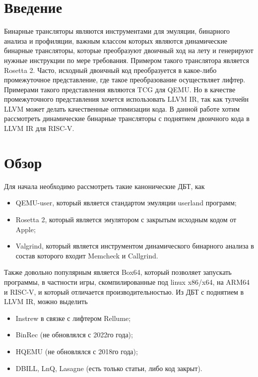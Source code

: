 
\section{Введение}
Бинарные трансляторы являются инструментами для эмуляции, бинарного анализа и профиляции, важным классом которых являются динамические бинарные трансляторы, которые преобразуют двоичный ход на лету и генерируют нужные инструкции по мере требования. Примером такого транслятора является Rosetta 2. Часто, исходный двоичный код преобразуется в какое-либо промежуточное представление, где такое преобразование осуществляет лифтер. Примерами такого представления являются TCG для QEMU. Но в качестве промежуточного представления хочется использовать LLVM IR, так как тулчейн LLVM может делать качественные оптимизации кода. В данной работе хотим рассмотреть динамические бинарные трансляторы с поднятием двоичного кода в LLVM IR для RISC-V.
\section{Обзор}
Для начала необходимо рассмотреть такие канонические ДБТ, как
\begin{itemize}
    \item QEMU-user, который является стандартом эмуляции userland программ;
    \item Rosetta 2, который является эмулятором с закрытым исходным кодом от Apple;
    \item Valgrind, который является инструментом динамического бинарного анализа в состав которого входит Memcheck и Callgrind.
\end{itemize}

Также довольно популярным является Box64, который позволяет запускать программы, в частности игры, скомпилированные под linux x86/x64, на ARM64 и RISC-V, и который отличается производительностью.
Из ДБТ с поднятием в LLVM IR, можно выделить
\begin{itemize}
    \item Instrew в связке с лифтером Rellume;
    \item BinRec (не обновлялся с 2022го года);
    \item HQEMU (не обновлялся с 2018го года);
    \item DBILL, LnQ, Lasagne (есть только статьи, либо код закрыт).
\end{itemize}

